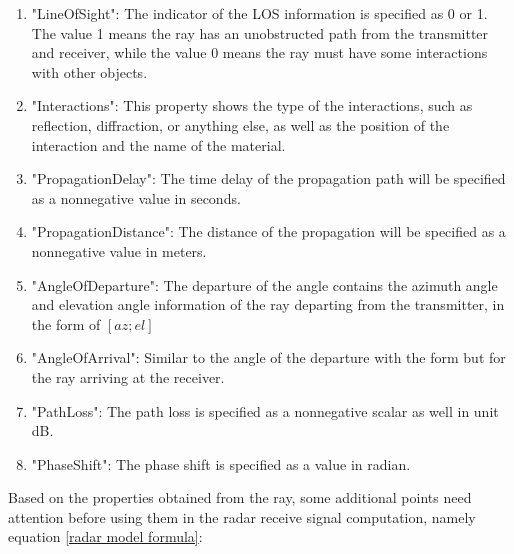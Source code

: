 \documentclass[12pt,DIV14,BCOR12mm,a4paper,footinclude=false,headinclude,parskip=half-,twoside,openright,cleardoublepage=empty,toc=index,bibliography=totoc,listof=totoc]{scrreprt}
\numberwithin{equation}{chapter}
\begin{document}
\begin{enumerate}[label=\textbullet]
    \item "LineOfSight": The indicator of the LOS information is specified as 0 or 1. The value 1 means the ray has an unobstructed path from the transmitter and receiver, while the value 0 means the ray must have some interactions with other objects.
    \item "Interactions": This property shows the type of the interactions, such as reflection, diffraction, or anything else, as well as the position of the interaction and the name of the material.
    \item "PropagationDelay": The time delay of the propagation path will be specified as a nonnegative value in seconds.
    \item "PropagationDistance": The distance of the propagation will be specified as a nonnegative value in meters.
    \item "AngleOfDeparture": The departure of the angle contains the azimuth angle and elevation angle information of the ray departing from the transmitter, in the form of $[az; el]$
    \item "AngleOfArrival": Similar to the angle of the departure with the form but for the ray arriving at the receiver.
    \item "PathLoss": The path loss is specified as a nonnegative scalar as well in unit dB.
    \item "PhaseShift": The phase shift is specified as a value in radian.
\end{enumerate}

Based on the properties obtained from the ray, some additional points need attention before using them in the radar receive signal computation, namely equation \ref{radar model formula}:
\end{document}
